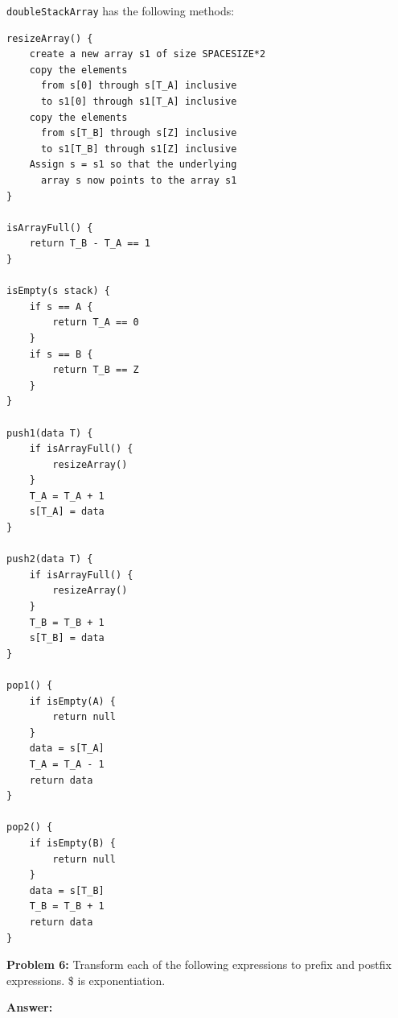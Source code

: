 \documentclass[12pt,letterpaper,final]{report}
\begin{document}
\texttt{doubleStackArray} has the following methods:
\pagebreak
\begin{mdframed}
\begin{verbatim}
resizeArray() {
    create a new array s1 of size SPACESIZE*2
    copy the elements
      from s[0] through s[T_A] inclusive
      to s1[0] through s1[T_A] inclusive
    copy the elements
      from s[T_B] through s[Z] inclusive
      to s1[T_B] through s1[Z] inclusive
    Assign s = s1 so that the underlying
      array s now points to the array s1
}

isArrayFull() {
    return T_B - T_A == 1
}

isEmpty(s stack) {
    if s == A {
        return T_A == 0
    }
    if s == B {
        return T_B == Z
    }
}

push1(data T) {
    if isArrayFull() {
        resizeArray()
    }
    T_A = T_A + 1
    s[T_A] = data
}

push2(data T) {
    if isArrayFull() {
        resizeArray()
    }
    T_B = T_B + 1
    s[T_B] = data
}

pop1() {
    if isEmpty(A) {
        return null
    }
    data = s[T_A]
    T_A = T_A - 1
    return data
}

pop2() {
    if isEmpty(B) {
        return null
    }
    data = s[T_B]
    T_B = T_B + 1
    return data
}
\end{verbatim}
\end{mdframed}

\pagebreak
\noindent\textbf{Problem 6:}
Transform each of the following expressions to prefix and postfix expressions. \$ is exponentiation.

\noindent\textbf{Answer:}
\end{document}
